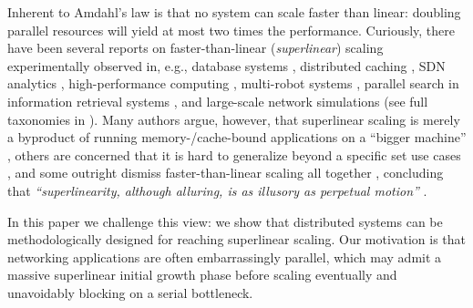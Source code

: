 Inherent to Amdahl's law is that no system can scale faster than linear: doubling parallel resources will yield at most two times the performance. Curiously, there have been several reports on faster-than-linear (\emph{superlinear}) scaling experimentally observed in, e.g., database systems \cite{scalability-analyzed, 10.5555/1012889.1012894}, distributed caching \cite{271208, dobb-2}, SDN analytics \cite{sdn-analytitcs}, high-performance computing \cite{556383, 7733347, 6483679}, multi-robot systems \cite{10.1007/978-3-319-77610-1},  parallel search in information retrieval systems \cite{dobb-1, dobb-2}, and large-scale network simulations \cite{10.1145/3627703.3629574} (see full taxonomies in \cite{7733347, 80148}).
Many authors argue, however, that superlinear scaling is merely a byproduct of running memory-\slash cache-bound applications on a ``bigger machine'' \cite{80148}, others are concerned that it is hard to generalize beyond a specific set use cases \cite{7733347, 80148}, and some outright dismiss faster-than-linear scaling all together \cite{gunther-hotsos, 10.1016/0167-8191(86)90024-4}, concluding that \emph{``superlinearity, although alluring, is as illusory as perpetual motion''} \cite{10.1145/2773212.2789974}.

In this paper we challenge this view: we show that distributed systems can be methodologically designed for reaching superlinear scaling. Our motivation is that networking applications are often embarrassingly parallel, %
which may admit a massive superlinear initial growth phase before scaling eventually and unavoidably blocking on a serial bottleneck.

